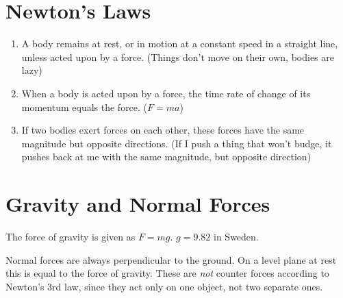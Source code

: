 \documentclass[12pt]{article}
\begin{document}
\section*{Newton's Laws}
	\begin{enumerate}
		\item A body remains at rest, or in motion at a constant speed in a straight line, unless acted upon by a force. (Things don't move on their own, bodies are lazy)
		\item When a body is acted upon by a force, the time rate of change of its momentum equals the force. ($F=ma$)
		\item If two bodies exert forces on each other, these forces have the same magnitude but opposite directions. (If I push a thing that won't budge, it pushes back at me with the same magnitude, but opposite direction)
	\end{enumerate}
\section*{Gravity and Normal Forces}
	The force of gravity is given as $F=mg$. $g=9.82$ in Sweden.

	Normal forces are always perpendicular to the ground. On a level plane at rest this is equal to the force of gravity. These are \emph{not} counter forces according to Newton's 3rd law, since they act only on one object, not two separate  ones.
\end{document}
